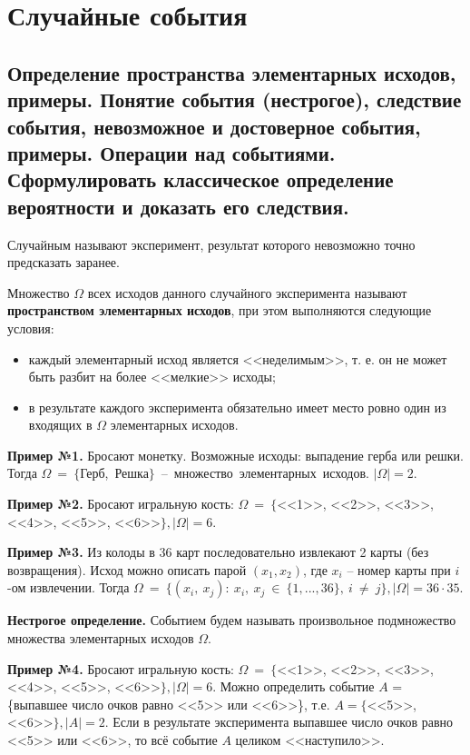 \chapter{Случайные события}

\section{Определение пространства элементарных исходов, примеры. Понятие события (нестрогое), следствие события, невозможное и достоверное события, примеры. Операции над событиями. Сформулировать классическое определение вероятности и доказать его следствия.}

Случайным называют эксперимент, результат которого невозможно точно предсказать заранее.

Множество $\Omega$ всех исходов данного случайного эксперимента называют \textbf{пространством элементарных исходов}, при этом выполняются следующие условия: 

\begin{itemize}
	\item каждый элементарный исход является <<неделимым>>, т. е. он не может быть разбит на более <<мелкие>> исходы;
	
	\item в результате каждого эксперимента обязательно имеет место ровно один из входящих в $\Omega$ элементарных исходов.
\end{itemize}

\textbf{Пример №1.} Бросают монетку. Возможные исходы: выпадение герба или решки. Тогда $\Omega~=~\{$Герб,~Решка$\}$~--~множество~элементарных~исходов. $|\Omega| = 2$.

\textbf{Пример №2.} Бросают игральную кость: $\Omega~=~\{$<<1>>, <<2>>, <<3>>, <<4>>, <<5>>, <<6>>$\}, |\Omega| = 6.$

\textbf{Пример №3.} Из колоды в 36 карт последовательно извлекают 2 карты (без возвращения). Исход можно описать парой $(x_1, x_2)$, где $x_i$ -- номер карты при $i$-ом извлечении. Тогда $\Omega~=~\{(x_i,~x_j):~x_i,~x_j~\in~\{1, ..., 36\},~i~\neq~j\}, |\Omega| = 36 \cdot 35.$ 


\textbf{Нестрогое определение.} Событием будем называть произвольное подмножество множества элементарных исходов $\Omega$.

\textbf{Пример №4.} Бросают игральную кость: $\Omega~=~\{$<<1>>, <<2>>, <<3>>, <<4>>, <<5>>, <<6>>$\}, |\Omega| = 6.$ Можно определить событие $A$ = \{выпавшее число очков равно <<5>> или <<6>>\}, т.е. $A = \{$<<5>>, <<6>>$\}, |A| = 2$. Если в результате эксперимента выпавшее число очков равно <<5>> или <<6>>, то всё событие $A$ целиком <<наступило>>.

